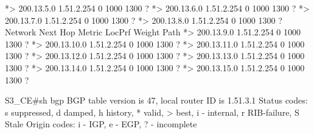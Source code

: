 \documentclass[10pt]{article}
\begin{document}
\begin{itemize}
\begin{verbatim*}
		*> 200.13.5.0       1.51.2.254                             0 1000 1300 ?
		*> 200.13.6.0       1.51.2.254                             0 1000 1300 ?
		*> 200.13.7.0       1.51.2.254                             0 1000 1300 ?
		*> 200.13.8.0       1.51.2.254                             0 1000 1300 ?
		   Network          Next Hop            Metric LocPrf Weight Path
		*> 200.13.9.0       1.51.2.254                             0 1000 1300 ?
		*> 200.13.10.0      1.51.2.254                             0 1000 1300 ?
		*> 200.13.11.0      1.51.2.254                             0 1000 1300 ?
		*> 200.13.12.0      1.51.2.254                             0 1000 1300 ?
		*> 200.13.13.0      1.51.2.254                             0 1000 1300 ?
		*> 200.13.14.0      1.51.2.254                             0 1000 1300 ?
		*> 200.13.15.0      1.51.2.254                             0 1000 1300 ?



		S3_CE#sh bgp
		BGP table version is 47, local router ID is 1.51.3.1
		Status codes: s suppressed, d damped, h history, * valid, > best, i - internal,
		              r RIB-failure, S Stale
		Origin codes: i - IGP, e - EGP, ? - incomplete


\end{verbatim*}
\end{itemize}
\end{document}
